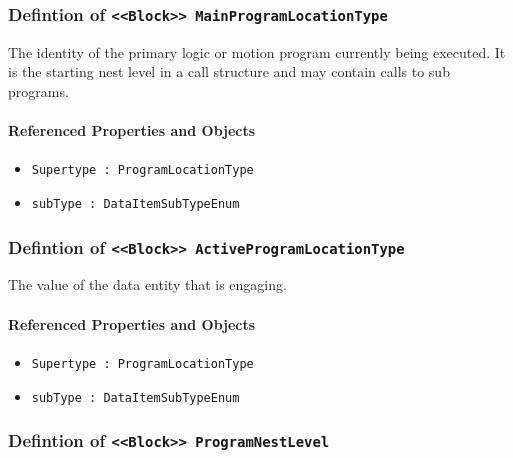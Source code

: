 \subsubsection{Defintion of \texttt{<<Block>> MainProgramLocationType}}
  \label{type:MainProgramLocationType}

\FloatBarrier

The identity of the primary logic or motion program currently being executed. It is the starting nest level in a call structure and may contain calls to sub programs.

\FloatBarrier
\paragraph{Referenced Properties and Objects}

\begin{itemize}
\item \texttt{Supertype : ProgramLocationType}

\item \texttt{subType : DataItemSubTypeEnum}

\end{itemize}
\FloatBarrier
\subsubsection{Defintion of \texttt{<<Block>> ActiveProgramLocationType}}
  \label{type:ActiveProgramLocationType}

\FloatBarrier

The value of the data entity that is engaging.

\FloatBarrier
\paragraph{Referenced Properties and Objects}

\begin{itemize}
\item \texttt{Supertype : ProgramLocationType}

\item \texttt{subType : DataItemSubTypeEnum}

\end{itemize}
\FloatBarrier
\subsubsection{Defintion of \texttt{<<Block>> ProgramNestLevel}}
  \label{type:ProgramNestLevel}

